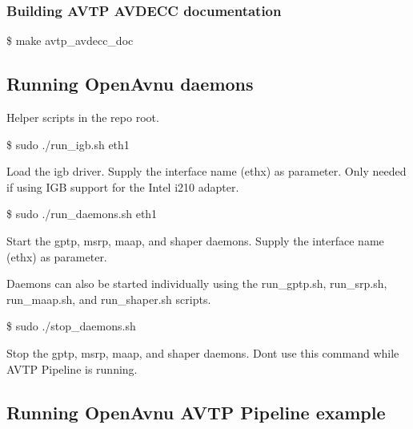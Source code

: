 \subsubsection*{Building A\+V\+TP A\+V\+D\+E\+CC documentation}


\begin{DoxyItemize}
\item \$ make avtp\+\_\+avdecc\+\_\+doc
\end{DoxyItemize}

\subsection*{Running Open\+Avnu daemons}


\begin{DoxyItemize}
\item Helper scripts in the repo root.
\item {\ttfamily \$ sudo ./run\+\_\+igb.sh eth1}
\begin{DoxyItemize}
\item Load the igb driver. Supply the interface name (ethx) as parameter. Only needed if using I\+GB support for the Intel i210 adapter.
\end{DoxyItemize}
\item {\ttfamily \$ sudo ./run\+\_\+daemons.sh eth1}
\begin{DoxyItemize}
\item Start the gptp, msrp, maap, and shaper daemons. Supply the interface name (ethx) as parameter.
\item Daemons can also be started individually using the run\+\_\+gptp.\+sh, run\+\_\+srp.\+sh, run\+\_\+maap.\+sh, and run\+\_\+shaper.\+sh scripts.
\end{DoxyItemize}
\item {\ttfamily \$ sudo ./stop\+\_\+daemons.sh}
\begin{DoxyItemize}
\item Stop the gptp, msrp, maap, and shaper daemons. Don\textquotesingle{}t use this command while A\+V\+TP Pipeline is running.
\end{DoxyItemize}
\end{DoxyItemize}

\subsection*{Running Open\+Avnu A\+V\+TP Pipeline example}


